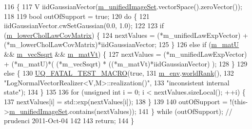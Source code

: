 \begin{DoxyCode}
116 \{
117   V iidGaussianVector(\hyperlink{class_q_u_e_s_o_1_1_base_vector_realizer_a6c705235d28a3c12641da57cde948872}{m\_unifiedImageSet}.vectorSpace().zeroVector());
118 
119   \textcolor{keywordtype}{bool} outOfSupport = \textcolor{keyword}{true};
120   \textcolor{keywordflow}{do} \{
121     iidGaussianVector.cwSetGaussian(0.0, 1.0);
122 
123     \textcolor{keywordflow}{if} (\hyperlink{class_q_u_e_s_o_1_1_log_normal_vector_realizer_a9a0d52cb94a3de5aa367d4e66f4fa137}{m\_lowerCholLawCovMatrix}) \{
124       nextValues = (*m\_unifiedLawExpVector) + (*m\_lowerCholLawCovMatrix)*iidGaussianVector;
125     \}
126     \textcolor{keywordflow}{else} \textcolor{keywordflow}{if} (\hyperlink{class_q_u_e_s_o_1_1_log_normal_vector_realizer_ac5d5aae6606895a42ab1c899bdb37906}{m\_matU} && \hyperlink{class_q_u_e_s_o_1_1_log_normal_vector_realizer_ad714ba417a345d76f32d9af389b4dccd}{m\_vecSsqrt} && \hyperlink{class_q_u_e_s_o_1_1_log_normal_vector_realizer_a7fcafdfed9d2ec7cc70b87109240754a}{m\_matVt}) \{
127       nextValues = (*m\_unifiedLawExpVector) + (*m\_matU)*( (*m\_vecSsqrt) * ((*m\_matVt)*iidGaussianVector) );
128     \}
129     \textcolor{keywordflow}{else} \{
130       \hyperlink{_defines_8h_a56d63d18d0a6d45757de47fcc06f574d}{UQ\_FATAL\_TEST\_MACRO}(\textcolor{keyword}{true},
131                           \hyperlink{class_q_u_e_s_o_1_1_base_vector_realizer_acde246c52f82d8ed687d91cfac14c29c}{m\_env}.\hyperlink{class_q_u_e_s_o_1_1_base_environment_a78b57112bbd0e6dd0e8afec00b40ffa7}{worldRank}(),
132                           \textcolor{stringliteral}{"LogNormalVectorRealizer<V,M>::realization()"},
133                           \textcolor{stringliteral}{"inconsistent internal state"});
134     \}
135 
136     \textcolor{keywordflow}{for} (\textcolor{keywordtype}{unsigned} \textcolor{keywordtype}{int} i = 0; i < nextValues.sizeLocal(); ++i) \{
137       nextValues[i] = std::exp(nextValues[i]);
138     \}
139 
140     outOfSupport = !(this->\hyperlink{class_q_u_e_s_o_1_1_base_vector_realizer_a6c705235d28a3c12641da57cde948872}{m\_unifiedImageSet}.contains(nextValues));
141   \} \textcolor{keywordflow}{while} (outOfSupport); \textcolor{comment}{// prudenci 2011-Oct-04}
142 
143   \textcolor{keywordflow}{return};
144 \}
\end{DoxyCode}
